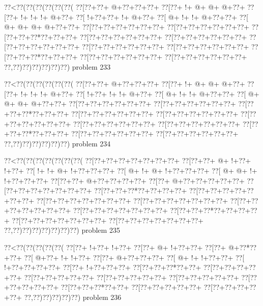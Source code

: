 \vbox{\vbox{\goo
\0??<\0??(\0??(\0??(\0??(\0??(\0??(
\0??[\0??+\0??+\- @+\0??+\0??+\0??+
\0??[\0??+\- !+\- @+\- @+\- @+\0??+
\0??[\0??+\- !+\- !+\- !+\- @+\0??+
\0??[\- !+\0??+\0??+\- !+\- @+\0??+
\0??[\- @+\- !+\- !+\- @+\0??+\0??+
\0??[\- @+\- @+\- @+\- @+\0??+\0??+
\0??[\0??+\0??+\0??+\0??+\0??+\0??+
\0??[\0??+\0??+\0??+\0??+\0??+\0??+
\0??[\0??+\0??+\0??*\0??+\0??+\0??+
\0??[\0??+\0??+\0??+\0??+\0??+\0??+
\0??[\0??+\0??+\0??+\0??+\0??+\0??+
\0??[\0??+\0??+\0??+\0??+\0??+\0??+
\0??[\0??+\0??+\0??+\0??+\0??+\0??+
\0??[\0??+\0??+\0??+\0??+\0??+\0??+
\0??[\0??+\0??+\0??*\0??+\0??+\0??+
\0??[\0??+\0??+\0??+\0??+\0??+\0??+
\0??[\0??+\0??+\0??+\0??+\0??+\0??+
\0??,\0??)\0??)\0??)\0??)\0??)\0??)
}
\hfil problem 233\hfil\break
}

\vbox{\vbox{\goo
\0??<\0??(\0??(\0??(\0??(\0??(\0??(
\0??[\0??+\0??+\- @+\0??+\0??+\0??+
\0??[\0??+\- !+\- @+\- @+\- @+\0??+
\0??[\0??+\- !+\- !+\- !+\- @+\0??+
\0??[\- !+\0??+\- !+\- !+\- @+\0??+
\0??[\- @+\- !+\- !+\- @+\0??+\0??+
\0??[\- @+\- @+\- @+\- @+\0??+\0??+
\0??[\0??+\0??+\0??+\0??+\0??+\0??+
\0??[\0??+\0??+\0??+\0??+\0??+\0??+
\0??[\0??+\0??+\0??*\0??+\0??+\0??+
\0??[\0??+\0??+\0??+\0??+\0??+\0??+
\0??[\0??+\0??+\0??+\0??+\0??+\0??+
\0??[\0??+\0??+\0??+\0??+\0??+\0??+
\0??[\0??+\0??+\0??+\0??+\0??+\0??+
\0??[\0??+\0??+\0??+\0??+\0??+\0??+
\0??[\0??+\0??+\0??*\0??+\0??+\0??+
\0??[\0??+\0??+\0??+\0??+\0??+\0??+
\0??[\0??+\0??+\0??+\0??+\0??+\0??+
\0??,\0??)\0??)\0??)\0??)\0??)\0??)
}
\hfil problem 234\hfil\break
}

\vbox{\vbox{\goo
\0??<\0??(\0??(\0??(\0??(\0??(\0??(\0??(
\0??[\0??+\0??+\0??+\0??+\0??+\0??+\0??+
\0??[\0??+\0??+\- @+\- !+\0??+\- !+\0??+
\0??[\- !+\- !+\- @+\- !+\0??+\0??+\0??+
\0??[\- @+\- !+\- @+\- !+\0??+\0??+\0??+
\0??[\- @+\- @+\- !+\- !+\0??+\0??+\0??+
\0??[\0??+\0??+\- @+\0??+\0??+\0??+\0??+
\0??[\0??+\- @+\0??+\0??+\0??+\0??+\0??+
\0??[\0??+\0??+\0??+\0??+\0??+\0??+\0??+
\0??[\0??+\0??+\0??*\0??+\0??+\0??+\0??+
\0??[\0??+\0??+\0??+\0??+\0??+\0??+\0??+
\0??[\0??+\0??+\0??+\0??+\0??+\0??+\0??+
\0??[\0??+\0??+\0??+\0??+\0??+\0??+\0??+
\0??[\0??+\0??+\0??+\0??+\0??+\0??+\0??+
\0??[\0??+\0??+\0??+\0??+\0??+\0??+\0??+
\0??[\0??+\0??+\0??*\0??+\0??+\0??+\0??+
\0??[\0??+\0??+\0??+\0??+\0??+\0??+\0??+
\0??[\0??+\0??+\0??+\0??+\0??+\0??+\0??+
\0??,\0??)\0??)\0??)\0??)\0??)\0??)\0??)
}
\hfil problem 235\hfil\break
}

\vbox{\vbox{\goo
\0??<\0??(\0??(\0??(\0??(\0??(
\0??[\0??+\- !+\0??+\- !+\0??+
\0??[\0??+\- @+\- !+\0??+\0??+
\0??[\0??+\- @+\0??*\0??+\0??+
\0??[\- @+\0??+\- !+\- !+\0??+
\0??[\0??+\- @+\0??+\0??+\0??+
\0??[\- @+\- !+\- !+\0??+\0??+
\0??[\- !+\0??+\0??+\0??+\0??+
\0??[\0??+\- !+\0??+\0??+\0??+
\0??[\0??+\0??+\0??*\0??+\0??+
\0??[\0??+\0??+\0??+\0??+\0??+
\0??[\0??+\0??+\0??+\0??+\0??+
\0??[\0??+\0??+\0??+\0??+\0??+
\0??[\0??+\0??+\0??+\0??+\0??+
\0??[\0??+\0??+\0??+\0??+\0??+
\0??[\0??+\0??+\0??*\0??+\0??+
\0??[\0??+\0??+\0??+\0??+\0??+
\0??[\0??+\0??+\0??+\0??+\0??+
\0??,\0??)\0??)\0??)\0??)\0??)
}
\hfil problem 236\hfil\break
}

